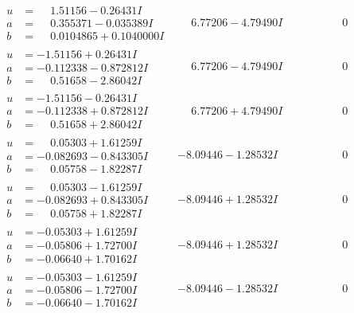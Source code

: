 \documentclass[1p]{elsarticle_modified}
\theoremstyle{definition}
\begin{document}
$$\begin{array}{c|c|c}
\begin{aligned}
u &= \phantom{-}1.51156 - 0.26431 I \\
a &= \phantom{-}0.355371 - 0.035389 I \\
b &= \phantom{-}0.0104865 + 0.1040000 I\end{aligned}
 & \phantom{-}6.77206 - 4.79490 I & \phantom{-0.000000 } 0 \\ \hline\begin{aligned}
u &= -1.51156 + 0.26431 I \\
a &= -0.112338 - 0.872812 I \\
b &= \phantom{-}0.51658 - 2.86042 I\end{aligned}
 & \phantom{-}6.77206 - 4.79490 I & \phantom{-0.000000 } 0 \\ \hline\begin{aligned}
u &= -1.51156 - 0.26431 I \\
a &= -0.112338 + 0.872812 I \\
b &= \phantom{-}0.51658 + 2.86042 I\end{aligned}
 & \phantom{-}6.77206 + 4.79490 I & \phantom{-0.000000 } 0 \\ \hline\begin{aligned}
u &= \phantom{-}0.05303 + 1.61259 I \\
a &= -0.082693 - 0.843305 I \\
b &= \phantom{-}0.05758 - 1.82287 I\end{aligned}
 & -8.09446 - 1.28532 I & \phantom{-0.000000 } 0 \\ \hline\begin{aligned}
u &= \phantom{-}0.05303 - 1.61259 I \\
a &= -0.082693 + 0.843305 I \\
b &= \phantom{-}0.05758 + 1.82287 I\end{aligned}
 & -8.09446 + 1.28532 I & \phantom{-0.000000 } 0 \\ \hline\begin{aligned}
u &= -0.05303 + 1.61259 I \\
a &= -0.05806 + 1.72700 I \\
b &= -0.06640 + 1.70162 I\end{aligned}
 & -8.09446 + 1.28532 I & \phantom{-0.000000 } 0 \\ \hline\begin{aligned}
u &= -0.05303 - 1.61259 I \\
a &= -0.05806 - 1.72700 I \\
b &= -0.06640 - 1.70162 I\end{aligned}
 & -8.09446 - 1.28532 I & \phantom{-0.000000 } 0 \\ \hline\begin{aligned}

\end{aligned}
\end{array}$$
\end{document}
